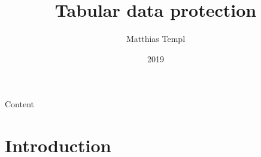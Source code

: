 \documentclass[pdfpagelabels=false, usepdftitle=false]{beamer}
\begin{document}

\title[Part 9: Tabular data protection]{
Tabular data protection}
\author[Templ]{Matthias Templ}
\date[2019]{2019}

\begin{frame}
\titlepage
\end{frame}

\setcounter{tocdepth}{1}
\section{}
\begin{frame}{Content}
\tableofcontents
\end{frame}

\color{pddblue}
\section{Introduction}
\end{document}
